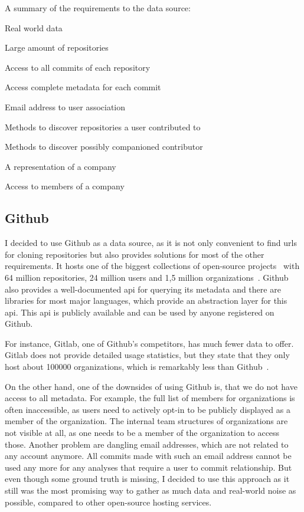 \begin{itemlist}{A summary of the requirements to the data source:}
    \item Real world data
    \item Large amount of repositories
    \item Access to all commits of each repository
    \item Access complete metadata for each commit
    \item Email address to user association
    \item Methods to discover repositories a user contributed to
    \item Methods to discover possibly companioned contributor
    \item A representation of a company
    \item Access to members of a company
\end{itemlist}


\subsection{Github}\label{github}
I decided to use Github as a data source, as it is not only convenient to find \acp{url} for cloning repositories but also provides solutions for most of the other requirements.
It hosts one of the biggest collections of open-source projects~\cite{techreport:how-github-conquered} with 64 million repositories, 24 million users and 1,5 million organizations~\cite{article:github-statistics}.
Github also provides a well-documented \ac{api} for querying its metadata and there are libraries for most major languages, which provide an abstraction layer for this \ac{api}.
This \ac{api} is publicly available and can be used by anyone registered on Github.

For instance, Gitlab, one of Github's competitors, has much fewer data to offer.
Gitlab does not provide detailed usage statistics, but they state that they only host about 100000 organizations, which is remarkably less than Github~\cite{article:gitlab-help}.

On the other hand, one of the downsides of using Github is, that we do not have access to all metadata.
For example, the full list of members for organizations is often inaccessible, as users need to actively opt-in to be publicly displayed as a member of the organization.
The internal team structures of organizations are not visible at all, as one needs to be a member of the organization to access those.
Another problem are dangling email addresses, which are not related to any account anymore.
All commits made with such an email address cannot be used any more for any analyses that require a user to commit relationship.
But even though some ground truth is missing, I decided to use this approach as it still was the most promising way to gather as much data and real-world noise as possible, compared to other open-source hosting services.

